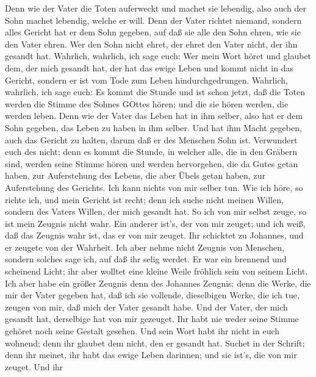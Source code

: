Denn wie der Vater die Toten auferweckt und machet sie lebendig, also
auch der Sohn machet lebendig, welche er will.  Denn der
Vater richtet niemand, sondern alles Gericht hat er dem Sohn gegeben,
 auf daß sie alle den Sohn ehren, wie sie den Vater ehren.
Wer den Sohn nicht ehret, der ehret den Vater nicht, der ihn gesandt
hat.  Wahrlich, wahrlich, ich sage euch: Wer mein Wort
höret und glaubet dem, der mich gesandt hat, der hat das ewige Leben und
kommt nicht in das Gericht, sondern er ist vom Tode zum Leben
hindurchgedrungen.  Wahrlich, wahrlich, ich sage euch: Es
kommt die Stunde und ist schon jetzt, daß die Toten werden die Stimme
des Sohnes GOttes hören; und die sie hören werden, die werden leben.
 Denn wie der Vater das Leben hat in ihm selber, also hat
er dem Sohn gegeben, das Leben zu haben in ihm selber.  Und
hat ihm Macht gegeben, auch das Gericht zu halten, darum daß er des
Menschen Sohn ist.  Verwundert euch des nicht; denn es
kommt die Stunde, in welcher alle, die in den Gräbern sind, werden seine
Stimme hören  und werden hervorgehen, die da Gutes getan
haben, zur Auferstehung des Lebens, die aber Übels getan haben, zur
Auferstehung des Gerichts.  Ich kann nichts von mir selber
tun. Wie ich höre, so richte ich, und mein Gericht ist recht; denn ich
suche nicht meinen Willen, sondern des Vaters Willen, der mich gesandt
hat.  So ich von mir selbst zeuge, so ist mein Zeugnis
nicht wahr.  Ein anderer ist's, der von mir zeuget; und ich
weiß, daß das Zeugnis wahr ist, das er von mir zeuget.  Ihr
schicktet zu Johannes, und er zeugete von der Wahrheit. 
Ich aber nehme nicht Zeugnis von Menschen, sondern solches sage ich, auf
daß ihr selig werdet.  Er war ein brennend und scheinend
Licht; ihr aber wolltet eine kleine Weile fröhlich sein von seinem
Licht.  Ich aber habe ein größer Zeugnis denn des Johannes
Zeugnis; denn die Werke, die mir der Vater gegeben hat, daß ich sie
vollende, dieselbigen Werke, die ich tue, zeugen von mir, daß mich der
Vater gesandt habe.  Und der Vater, der mich gesandt hat,
derselbige hat von mir gezeuget. Ihr habt nie weder seine Stimme gehöret
noch seine Gestalt gesehen.  Und sein Wort habt ihr nicht
in euch wohnend; denn ihr glaubet dem nicht, den er gesandt hat.
 Suchet in der Schrift; denn ihr meinet, ihr habt das ewige
Leben darinnen; und sie ist's, die von mir zeuget.  Und ihr
